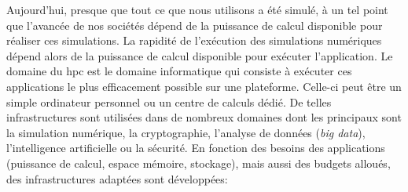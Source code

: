         
    Aujourd'hui, presque que tout ce que nous utilisons a été simulé, à un tel point que l’avancée de nos sociétés dépend de la puissance de calcul disponible pour réaliser ces simulations. La rapidité de l'exécution des simulations numériques dépend alors de la puissance de calcul disponible pour exécuter l’application. Le domaine du \gls{hpc} est le domaine informatique qui consiste à exécuter ces applications le plus efficacement possible sur une plateforme. Celle-ci peut être un simple ordinateur personnel ou un centre de calculs dédié. De telles infrastructures sont utilisées dans de nombreux domaines dont les principaux sont la simulation numérique, la cryptographie, l'analyse de données (\textit{big data}), l’intelligence artificielle ou la sécurité. En fonction des besoins des applications (puissance de calcul, espace mémoire, stockage), mais aussi des budgets alloués, des infrastructures adaptées sont développées:
    
